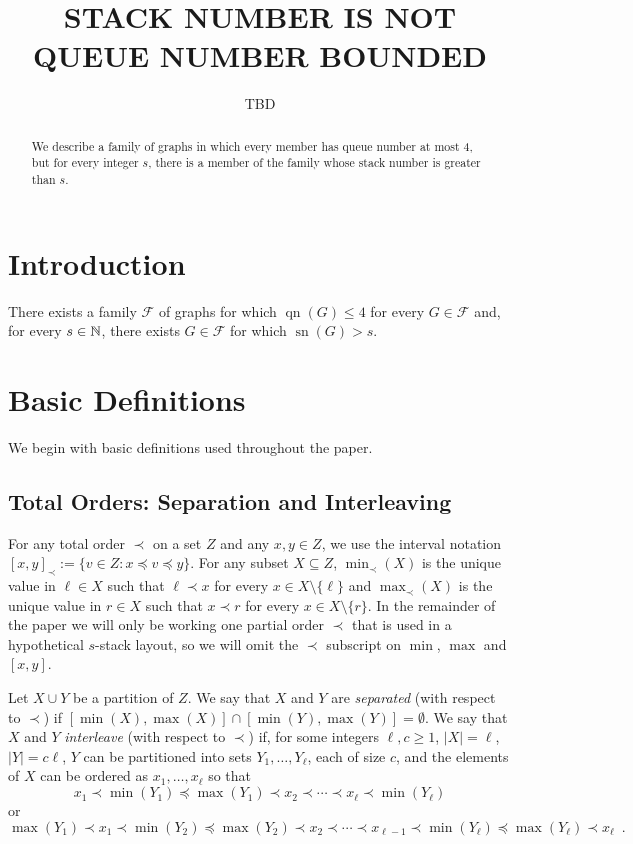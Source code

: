 \documentclass[kpfonts]{patmorin}
\title{\MakeUppercase{Stack Number is not Queue Number Bounded}}
\author{TBD}
\DeclareMathOperator{\sn}{sn}
\DeclareMathOperator{\qn}{qn}
\begin{document}
\maketitle

\begin{abstract}
  We describe a family of graphs in which every member has queue number at most 4, but for every integer $s$, there is a member of the family whose stack number is greater than $s$.
\end{abstract}

\section{Introduction}


\begin{thm}
  There exists a family $\mathcal{F}$ of graphs for which $\qn(G)\le 4$ for every $G\in\mathcal{F}$ and, for every $s\in\mathbb{N}$, there exists $G\in\mathcal{F}$ for which $\sn(G)>s$.
\end{thm}

\section{Basic Definitions}

We begin with basic definitions used throughout the paper.

\subsection{Total Orders: Separation and Interleaving}
For any total order $\prec$ on a set $Z$ and any $x,y\in Z$, we use the interval notation $[x,y]_\prec:=\{v\in Z: x\preceq v\preceq y\}$.  For any subset $X\subseteq Z$, $\min_\prec(X)$ is the unique value in $\ell\in X$ such that $\ell\prec x$ for every $x\in X\setminus\{\ell\}$ and $\max_\prec(X)$ is the unique value in $r\in X$ such that $x\prec r$ for every $x\in X\setminus\{r\}$.  In the remainder of the paper we will only be working one partial order $\prec$ that is used in a hypothetical $s$-stack layout, so we will omit the $\prec$ subscript on $\min$, $\max$ and $[x,y]$.

Let $X\cup Y$ be a partition of $Z$.  We say that $X$ and $Y$ are \emph{separated} (with respect to $\prec$) if $[\min(X),\max(X)]\cap [\min(Y),\max(Y)]=\emptyset$.  We say that $X$ and $Y$ \emph{interleave} (with respect to $\prec$) if, for some integers $\ell,c\ge 1$, $|X|=\ell$, $|Y|=c\ell$, $Y$ can be partitioned into sets $Y_1,\ldots,Y_{\ell}$, each of size $c$, and the elements of $X$ can be ordered as $x_1,\ldots,x_\ell$ so that 
\[  
  x_1\prec \min(Y_1) \preceq \max(Y_1) \prec x_2 \prec \cdots \prec x_{\ell} \prec \min(Y_\ell) 
\]
or 
\[  
  \max(Y_1) \prec x_1 \prec\min(Y_2)\preceq \max(Y_2)\prec x_2 \prec \cdots \prec x_{\ell-1} \prec \min(Y_\ell) \preceq \max(Y_\ell) \prec x_\ell \enspace . 
\]
\end{document}
